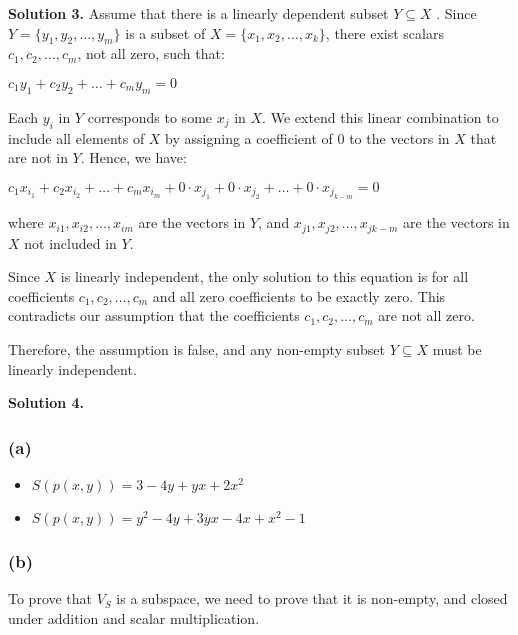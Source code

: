 \documentclass[12pt]{article}
\newcommand{\solution}[1]{\noindent \textbf{Solution #1.}}
\begin{document}
\solution{3}
  Assume that there is a linearly dependent subset \( Y \subseteq X \) . Since \( Y = \{y_1, y_2, \dots, y_m\} \) is a subset of \( X = \{x_1, x_2, \dots, x_k\} \), there exist scalars \( c_1, c_2, \dots, c_m \), not all zero, such that:

  \begin{center}
  $
  c_1 y_1 + c_2 y_2 + \dots + c_m y_m = 0
  $
  \end{center}

  Each \( y_i \) in \( Y \) corresponds to some \( x_j \) in \( X \). We extend this linear combination to include all elements of \( X \) by assigning a coefficient of 0 to the vectors in \( X \) that are not in \( Y \). Hence, we have:

  \begin{center}
    $
    c_1 x_{i_1} + c_2 x_{i_2} + \dots + c_m x_{i_m} + 0 \cdot x_{j_1} + 0 \cdot x_{j_2} + \dots + 0 \cdot x_{j_{k-m}} = 0
    $
  \end{center}

  where \( x_{i1}, x_{i2}, \dots, x_{im} \) are the vectors in \( Y \), and \( x_{j1}, x_{j2}, \dots, x_{jk-m} \) are the vectors in \( X \) not included in \( Y \).

  Since \( X \) is linearly independent, the only solution to this equation is for all coefficients \( c_1, c_2, \dots, c_m \) and all zero coefficients to be exactly zero. This contradicts our assumption that the coefficients \( c_1, c_2, \dots, c_m \) are not all zero.

  Therefore, the assumption is false, and any non-empty subset \( Y \subseteq X \) must be linearly independent.


\solution{4}
  \subsubsection*{(a)}
    \begin{itemize}
      \item $S(p(x, y))= 3-4y+yx+2x^2$
      \item $S(p(x, y))= y^2 - 4y + 3yx -4x +x^2 -1$
    \end{itemize}

  \subsubsection*{(b)}

  To prove that \( V_S \) is a subspace, we need to  prove that it is non-empty, and closed under addition and scalar multiplication.
\end{document}
